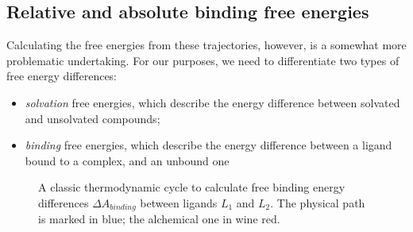 \documentclass[oneside]{scrreprt}
\begin{document}
\subsection{Relative and absolute binding free energies}

Calculating the free energies from these trajectories, however, is a somewhat more problematic undertaking. For our purposes, we need to differentiate two types of free energy differences:
\begin{itemize}
    \item \emph{solvation} free energies, which describe the energy difference between solvated and unsolvated compounds;
    \item \emph{binding} free energies, which describe the energy difference between a ligand bound to a complex, and an unbound one
\end{itemize}

\begin{figure}[H]
   
    
    

  \begin{center}

    
    \caption[Thermodynamic cycle for RBFE differences]{A classic thermodynamic cycle to calculate free binding energy differences $\Delta A_{binding}$ between ligands $L_1$ and $L_2$. The physical path is marked in blue; the alchemical one in wine red.} 
    \label{fig:thermocycle_rbfe}
  \end{center}
\end{figure}
\end{document}
